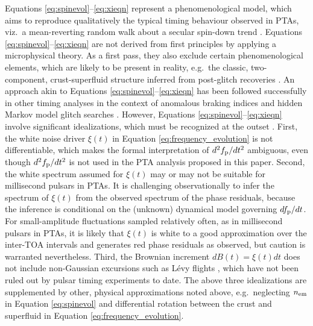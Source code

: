 \documentclass[fleqn,usenatbib,useAMS]{mnras}
\begin{document}
Equations \eqref{eq:spinevol}--\eqref{eq:xieqn} represent a phenomenological model, which aims to reproduce qualitatively the typical timing behaviour observed in PTAs, viz.\ a mean-reverting random walk about a secular spin-down trend \citep{NANOgrav2023,EPTA2023,Zic2023arXiv230616230Z}. Equations \eqref{eq:spinevol}--\eqref{eq:xieqn} are not derived from first principles by applying a microphysical theory. As a first pass, they also exclude certain phenomenological elements, which are likely to be present in reality, e.g.\ the classic, two-component, crust-superfluid structure inferred from post-glitch recoveries \citep{Baym1969,vanEysden,Alpar2017MNRAS.471.4827G,Myers2021MNRAS.502.3113M,Meyers2021}. An approach akin to Equations \eqref{eq:spinevol}--\eqref{eq:xieqn} has been followed successfully in other timing analyses in the context of anomalous braking indices \citep{Vargas} and hidden Markov model glitch searches \citep{Melatos2020ApJ...896...78M,Lower2021MNRAS.508.3251L,Dunn2022,Dunn2023MNRAS.522.5469D}. However, Equations \eqref{eq:spinevol}--\eqref{eq:xieqn}  involve significant idealizations, which must be recognized at the outset \citep{Meyers2021,Myers2021MNRAS.502.3113M,Vargas}. First, the white noise driver $\xi(t)$ in Equation \eqref{eq:frequency_evolution} is not differentiable, which makes the formal interpretation of $d^2 f_{\rm p} / dt^2$ ambiguous, even though $d^2 f_{\rm p} / dt^2$ is not used in the PTA analysis proposed in this paper. Second, the white spectrum assumed for $\xi(t)$ may or may not be suitable for millisecond pulsars in PTAs. It is challenging observationally to infer the spectrum of $\xi(t)$ from the observed spectrum of the phase residuals, because the inference is conditional on the (unknown) dynamical model governing $df_{\rm p}/dt$. For small-amplitude fluctuations sampled relatively often, as in millisecond pulsars in PTAs, it is likely that $\xi(t)$ is white to a good approximation over the inter-TOA intervals and generates red phase residuals as observed, but caution is warranted nevertheless. Third, the Brownian increment $dB(t)=\xi(t)dt$ does not include non-Gaussian excursions such as L\'{e}vy flights \citep{Sornette2004}, which have not been ruled out by pulsar timing experiments to date. The above three idealizations are supplemented by other, physical approximations noted above, e.g.\ neglecting $n_{\rm em}$ in Equation \eqref{eq:spinevol} and differential rotation between the crust and superfluid in Equation \eqref{eq:frequency_evolution}.
\end{document}
